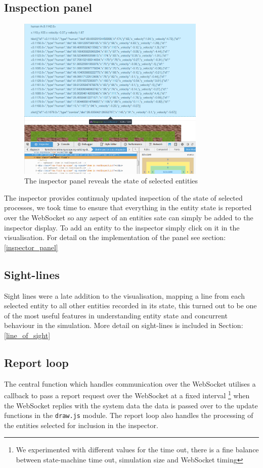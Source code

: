 \subsection{Inspection panel}
\begin{figure}[h]
  \centering
  \includegraphics[width=0.8\textwidth]{img/inspector.png}
\caption{The inspector panel reveals the state of selected entities}
    \label{fig:inspector}
\end{figure}
The inspector provides continualy updated inspection of the state of selected processes, we took time to ensure that everything in the entity state is reported over the WebSocket so any aspect of an entities sate can simply be added to the inspector display. To add an entity to the inspector simply click on it in the visualisation. For detail on the implementation of the panel see section:\ref{inspector_panel}
\subsection{Sight-lines}
\label{sight_lines}
Sight lines were a late addition to the visualisation, mapping a line from each selected entity to all other entities recorded in its state, this turned out to be one of the most useful features in understanding entity state and concurrent behaviour in the simulation. More detail on sight-lines is included in Section:\ref{line_of_sight}

\subsection{Report loop}
The central function which handles communication over the WebSocket utilises a callback to pass a report request over the WebSocket at a fixed interval \footnote{We experimented with different values for the time out, there is a fine balance between state-machine time out, simulation size and WebSocket timing} when the WebSocket replies with the system data the data is passed over to the update functions in the \verb+draw.js+ module. The report loop also handles the processing of the entities selected for inclusion in the inspector.
\clearpage
\endinput
